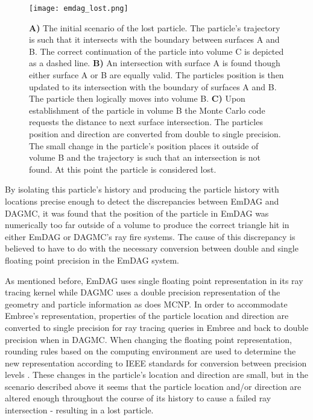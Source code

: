 \begin{figure}[h!]
  \begin{centering}
    \texttt{[image: emdag\_lost.png]}
    \caption{\textbf{A)} The initial scenario of the lost particle. The
      particle's trajectory is such that it intersects with the boundary between
      surfaces A and B. The correct continuation of the particle into volume C
      is depicted as a dashed line. \textbf{B)} An intersection with surface A
      is found though either surface A or B are equally valid. The particles
      position is then updated to its intersection with the boundary of surfaces
      A and B. The particle then logically moves into volume B. \textbf{C)} Upon
      establishment of the particle in volume B the Monte Carlo code requests
      the distance to next surface intersection. The particles position and
      direction are converted from double to single precision. The small change
      in the particle's position places it outside of volume B and the
      trajectory is such that an intersection is not found. At this point the
      particle is considered lost.}
    \label{emdag-lost-particles}
  \end{centering}
  \end{figure}

By isolating this particle's history and producing the particle history with
locations precise enough to detect the discrepancies between EmDAG and DAGMC, it
was found that the position of the particle in EmDAG was numerically too far
outside of a volume to produce the correct triangle hit in either EmDAG or
DAGMC's ray fire systems. The cause of this discrepancy is believed to have to
do with the necessary conversion between double and single floating point
precision in the EmDAG system.

As mentioned before, EmDAG uses single floating point representation in its ray
tracing kernel while DAGMC uses a double precision representation of the
geometry and particle information as does MCNP. In order to accommodate Embree's
representation, properties of the particle location and direction are converted
to single precision for ray tracing queries in Embree and back to double
precision when in DAGMC. When changing the floating point representation,
rounding rules based on the computing environment are used to determine the new
representation according to IEEE standards for conversion between precision
levels \cite{IEEE_STD_2008}. These changes in the particle's location and
direction are small, but in the scenario described above it seems that the
particle location and/or direction are altered enough throughout the course of
its history to cause a failed ray intersection - resulting in a lost particle.

